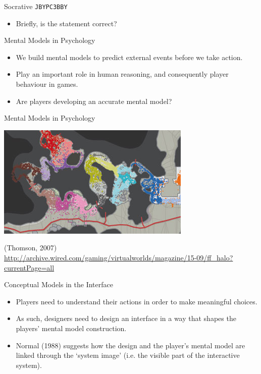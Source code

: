 \begin{frame}[fragile]{Socrative \texttt{JBYPC3BBY}}
	\begin{itemize}
		\item Briefly, is the statement correct?
	\end{itemize}
\end{frame}

\begin{frame}{Mental Models in Psychology}
	\begin{itemize}
		\item We build mental models to predict external events before we take action.
		\item Play an important role in human reasoning, and consequently player behaviour in games.
		\item Are players developing an accurate mental model?
	\end{itemize}
\end{frame}

\begin{frame}{Mental Models in Psychology}
	\begin{centering}
		\includegraphics[height=20ex]{halo_heat_map.jpg}
	\end{centering}
	
	\vspace{2ex}
	
	(Thomson, 2007) \\
	\url{http://archive.wired.com/gaming/virtualworlds/magazine/15-09/ff_halo?currentPage=all}
\end{frame}

\begin{frame}{Conceptual Models in the Interface}
	\begin{itemize}
		\item Players need to understand their actions in order to make meaningful choices.
		\item As such, designers need to design an interface in a way that shapes the players' mental model construction.
		\item Normal (1988) suggests how the design and the player's mental model are linked through the `system image' (i.e. the visible part
		of the interactive system).
	\end{itemize}
\end{frame}

